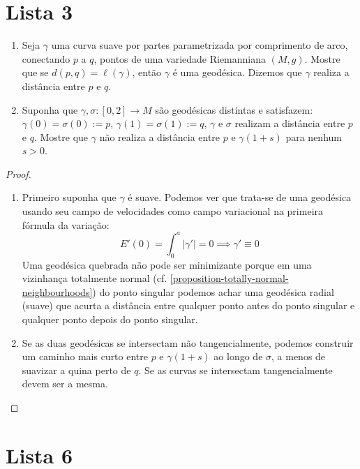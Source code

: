 \section{Lista 3}
\label{section-lista-3}

\begin{exercise}
\label{exercise-curvas-minimizantes}
\begin{enumerate}
\item Seja $\gamma$ uma curva suave por partes parametrizada por comprimento de
 arco, conectando $p$ a $q$, pontos de uma variedade Riemanniana $(M,g)$.
 Mostre que se $d(p,q)=\ell(\gamma)$, então $\gamma$ é uma geodésica.
 Dizemos que $\gamma$ realiza a distância entre $p$ e $q$.
\item Suponha que $\gamma,\sigma:[0,2]\to M$ são geodésicas distintas
 e satisfazem: $\gamma(0)=\sigma(0):=p$, $\gamma(1)=\sigma(1):=q$, 
$\gamma$ e $\sigma$ realizam a distância entre $p$ e $q$.
 Mostre que $\gamma$ não realiza a distância entre $p$ e $\gamma(1+s)$ 
para nenhum $s>0$.
\end{enumerate}
\end{exercise}

\begin{proof}
\begin{enumerate}
\item Primeiro suponha que $\gamma$ é suave. Podemos ver que trata-se de uma 
geodésica usando seu campo de velocidades como campo variacional na primeira
fórmula da variação:
$$
E'(0)=\int_0^a |\gamma'|=0 \implies \gamma'\equiv 0
$$
Uma geodésica quebrada não pode ser minimizante porque em uma vizinhança 
totalmente normal (cf. \ref{proposition-totally-normal-neighbourhoods}) 
do ponto singular podemos achar uma geodésica radial (suave)
 que acurta a distância entre qualquer ponto antes do ponto singular
 e qualquer ponto depois do ponto singular.
\item Se as duas geodésicas se intersectam não tangencialmente, podemos 
construir um caminho mais curto entre $p$ e $\gamma(1+s)$ ao longo de $\sigma$,
a menos de suavizar a quina perto de $q$. Se as curvas se intersectam
 tangencialmente devem ser a mesma.
\end{enumerate}
\end{proof}

\section{Lista 6}
\label{section-lista-6}

